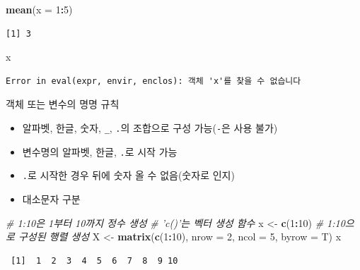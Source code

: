 \documentclass[
  11pt,
]{krantz}
\newenvironment{Shaded}{\begin{snugshade}}{\end{snugshade}}
\newcommand{\CommentTok}[1]{\textcolor[rgb]{0.37,0.37,0.37}{\textit{#1}}}
\newcommand{\DataTypeTok}[1]{\textcolor[rgb]{0.27,0.27,0.27}{#1}}
\newcommand{\DecValTok}[1]{\textcolor[rgb]{0.06,0.06,0.06}{#1}}
\newcommand{\KeywordTok}[1]{\textcolor[rgb]{0.27,0.27,0.27}{\textbf{#1}}}
\newcommand{\NormalTok}[1]{#1}
\newcommand{\OperatorTok}[1]{\textcolor[rgb]{0.43,0.43,0.43}{\textbf{#1}}}
\newcommand{\StringTok}[1]{\textcolor[rgb]{0.5,0.5,0.5}{#1}}
\providecommand{\tightlist}{%
  \setlength{\itemsep}{0pt}\setlength{\parskip}{0pt}}
\begin{document}
\begin{Shaded}
\begin{Highlighting}[]
\KeywordTok{mean}\NormalTok{(}\DataTypeTok{x =} \DecValTok{1}\OperatorTok{:}\DecValTok{5}\NormalTok{)}
\end{Highlighting}
\end{Shaded}

\begin{verbatim}
[1] 3
\end{verbatim}

\begin{Shaded}
\begin{Highlighting}[]
\NormalTok{x}
\end{Highlighting}
\end{Shaded}

\begin{verbatim}
Error in eval(expr, envir, enclos): 객체 'x'를 찾을 수 없습니다
\end{verbatim}

\normalsize

객체 또는 변수의 명명 규칙

\begin{itemize}
\tightlist
\item
  알파벳, 한글, 숫자, \texttt{\_}, \texttt{.}의 조합으로 구성 가능(\texttt{-}은 사용 불가)
\item
  변수명의 알파벳, 한글, \texttt{.}로 시작 가능
\item
  \texttt{.}로 시작한 경우 뒤에 숫자 올 수 없음(숫자로 인지)
\item
  대소문자 구분
\end{itemize}

\footnotesize

\begin{Shaded}
\begin{Highlighting}[]
\CommentTok{# 1:10은 1부터 10까지 정수 생성}
\CommentTok{# 'c()'는 벡터 생성 함수}
\NormalTok{x <-}\StringTok{ }\KeywordTok{c}\NormalTok{(}\DecValTok{1}\OperatorTok{:}\DecValTok{10}\NormalTok{) }
\CommentTok{# 1:10으로 구성된 행렬 생성}
\NormalTok{X <-}\StringTok{ }\KeywordTok{matrix}\NormalTok{(}\KeywordTok{c}\NormalTok{(}\DecValTok{1}\OperatorTok{:}\DecValTok{10}\NormalTok{), }\DataTypeTok{nrow =} \DecValTok{2}\NormalTok{, }\DataTypeTok{ncol =} \DecValTok{5}\NormalTok{, }\DataTypeTok{byrow =}\NormalTok{ T)}
\NormalTok{x}
\end{Highlighting}
\end{Shaded}

\begin{verbatim}
 [1]  1  2  3  4  5  6  7  8  9 10
\end{verbatim}
\end{document}
